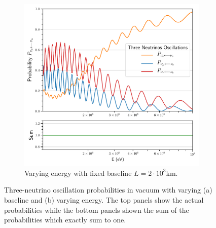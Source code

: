 \documentclass[twocolumn,secnumarabic,amssymb, nobibnotes, aps, prd,10pt]{revtex4-1}
\begin{document}
\begin{figure}
\begin{subfigure}{1.05\linewidth}
\includegraphics[width=\linewidth]{Osc3VacuumEnergy.pdf}
\caption{Varying energy with fixed baseline $L=2 \cdot 10^3 \mathrm{km}$.} 
\label{fig:vacuum} 
\end{subfigure}
\caption{Three-neutrino oscillation probabilities in vacuum with varying (a) baseline
and (b) varying energy. The top panels show the actual probabilities while the bottom
panels shown the sum of the probabilities which exactly sum to one.}
\end{figure}
\end{document}
